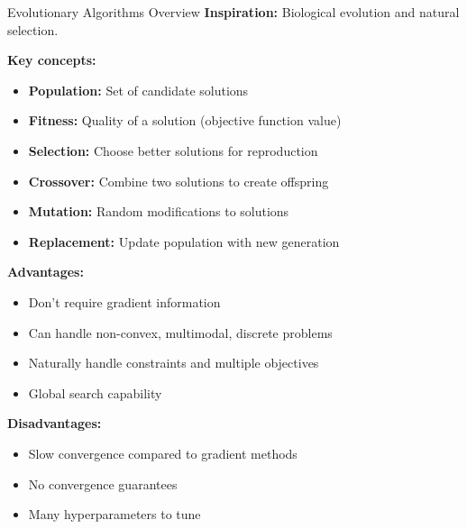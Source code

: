 \documentclass[aspectratio=169]{beamer}
\begin{document}
\begin{frame}{Evolutionary Algorithms Overview}
  \textbf{Inspiration:} Biological evolution and natural selection.

  \vspace{0.5em}

  \textbf{Key concepts:}
  \begin{itemize}
    \item \textbf{Population:} Set of candidate solutions
    \item \textbf{Fitness:} Quality of a solution (objective function value)
    \item \textbf{Selection:} Choose better solutions for reproduction
    \item \textbf{Crossover:} Combine two solutions to create offspring
    \item \textbf{Mutation:} Random modifications to solutions
    \item \textbf{Replacement:} Update population with new generation
  \end{itemize}

  \vspace{0.5em}

  \textbf{Advantages:}
  \begin{itemize}
    \item Don't require gradient information
    \item Can handle non-convex, multimodal, discrete problems
    \item Naturally handle constraints and multiple objectives
    \item Global search capability
  \end{itemize}

  \vspace{0.5em}

  \textbf{Disadvantages:}
  \begin{itemize}
    \item Slow convergence compared to gradient methods
    \item No convergence guarantees
    \item Many hyperparameters to tune
  \end{itemize}
\end{frame}
\end{document}
